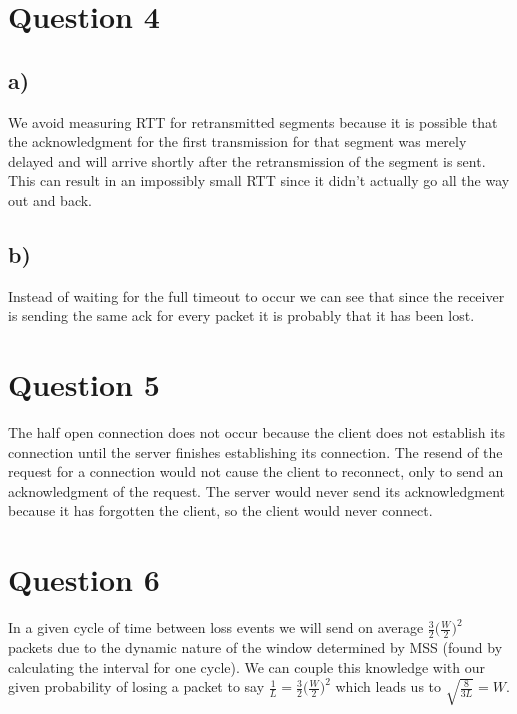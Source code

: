 \documentclass{article}
\begin{document}

\section{Question 4} %
\label{sec:question_4}
\subsection{a)} %
\label{sub:a_}
We avoid measuring RTT for retransmitted segments because it is possible that the acknowledgment for the first transmission for that segment was merely delayed and will arrive shortly after the retransmission of the segment is sent. This can result in an impossibly small RTT since it didn't actually go all the way out and back. 
\subsection{b)} %
\label{sub:b_}
Instead of waiting for the full timeout to occur we can see that since the receiver is sending the same ack for every packet it is probably that it has been lost. 

\section{Question 5} %
\label{sec:question_5}
The half open connection does not occur because the client does not establish its connection until the server finishes establishing its connection. The resend of the request for a connection would not cause the client to reconnect, only to send an acknowledgment of the request. The server would never send its acknowledgment because it has forgotten the client, so the client would never connect.


\section{Question 6} %
\label{sec:question_6}
In a given cycle of time between loss events we will send on average $\frac{3}{2}\bigg(\frac{W}{2}\bigg)^2$ packets due to the dynamic nature of the window determined by MSS (found by calculating the interval for one cycle).  We can couple this knowledge with our given probability of losing a packet to say $\frac{1}{L} = \frac{3}{2}\bigg(\frac{W}{2}\bigg)^2$ which leads us to $\sqrt{\frac{8}{3L}} = W$.
\end{document}
